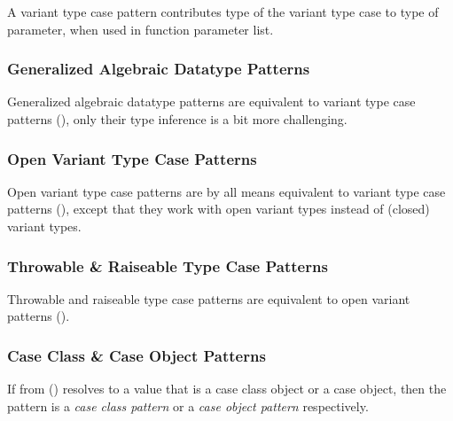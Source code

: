 A variant type case pattern contributes type of the variant type case to type of parameter, when used in function parameter list. 





\subsubsection{Generalized Algebraic Datatype Patterns}
\label{sec:gadt-patterns}

Generalized algebraic datatype patterns are equivalent to variant type case patterns (), only their type inference is a bit more challenging.





\subsubsection{Open Variant Type Case Patterns}
\label{sec:open-variant-patterns}

Open variant type case patterns are by all means equivalent to variant type case patterns (), except that they work with open variant types instead of (closed) variant types. 





\subsubsection{Throwable \& Raiseable Type Case Patterns}
\label{sec:throwable-patterns}

Throwable and raiseable type case patterns are equivalent to open variant patterns ().





\subsubsection{Case Class \& Case Object Patterns}
\label{sec:case-class-patterns}
\label{sec:case-object-patterns}

If  from () resolves to a value that is a case class object or a case object, then the pattern is a {\em case class pattern} or a {\em case object pattern} respectively. 

